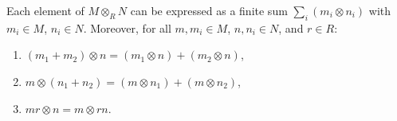 Each element of $M \otimes_R N$ can be expressed as a finite sum $\sum_i (m_i \otimes n_i)$ with $m_i \in M$, $n_i \in N$. Moreover, for all $m, m_i \in M$, $n, n_i \in N$, and $r \in R$:
\begin{enumerate}
\item[(1)] $(m_1 + m_2) \otimes n = (m_1 \otimes n) + (m_2 \otimes n)$,
\item[(2)] $m \otimes (n_1 + n_2) = (m \otimes n_1) + (m \otimes n_2)$,
\item[(3)] $mr \otimes n = m \otimes rn$.
\end{enumerate}
